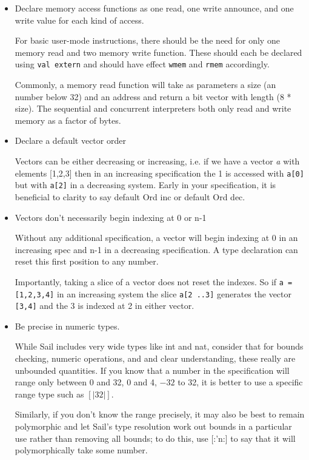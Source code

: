 \documentclass[11pt]{article}
\begin{document}
\begin{itemize}

\item Declare memory access functions as one read, one write announce,
  and one write value for each kind of access.

For basic user-mode instructions, there should be the need for only
one memory read and two memory write function. These should each be
declared using {\tt val extern} and should have effect {\tt wmem} and
{\tt rmem} accordingly. 

Commonly, a memory read function will take as parameters a size (an
number below 32) and an address and return a bit vector with length (8
* size). The sequential and concurrent interpreters both only read and
write memory as a factor of bytes.

\item Declare a default vector order

Vectors can be either decreasing or increasing, i.e. if we have a
vector \emph{a} with elements [1,2,3] then in an increasing specification the 1 is accessed
with {\tt a[0]} but with {\tt a[2]} in a decreasing system. Early in
your specification, it is beneficial to clarity to say default Ord inc
or default Ord dec.

\item Vectors don't necessarily begin indexing at 0 or n-1

Without any additional specification, a vector will begin indexing at
0 in an increasing spec and n-1 in a decreasing specification. A type
declaration can reset this first position to any number. 

Importantly, taking a slice of a vector does not reset the indexes. So
if {\tt a = [1,2,3,4]} in an increasing system the slice {\tt a[2
  ..3]} generates the vector {\tt [3,4]} and the 3 is indexed at 2 in either vector.

\item Be precise in numeric types. 

While Sail includes very wide types like int and nat, consider that
for bounds checking, numeric operations, and and clear understanding,
these really are unbounded quantities. If you know that a number in
the specification will range only between 0 and 32, 0 and 4, $-32$ to
32, it is better to use a specific range type such as $[|32|]$. 

Similarly, if you don't know the range precisely, it may also be best
to remain polymorphic and let Sail's type resolution work out bounds
in a particular use rather than removing all bounds; to do this, use
[:'n:] to say that it will polymorphically take some number.


\end{itemize}
\end{document}
